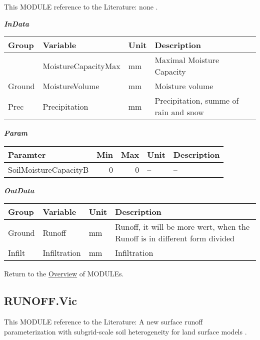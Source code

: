 \documentclass[
]{book}
\begin{document}
This MODULE reference to the Literature: none \citep{none}.

\textbf{\emph{InData}}

\begin{table}[!h]
\centering
\begin{tabular}{l|l|l|l}
\hline
Group & Variable & Unit & Description\\
\hline
 & MoistureCapacityMax & mm & Maximal Moisture Capacity\\
\cline{2-4}
\multirow{-2}{*}{\raggedright\arraybackslash Ground} & MoistureVolume & mm & Moisture volume\\
\cline{1-4}
Prec & Precipitation & mm & Precipitation, summe of rain and snow\\
\hline
\end{tabular}
\end{table}

\textbf{\emph{Param}}

\begin{table}[!h]
\centering
\begin{tabular}{l|r|r|l|l}
\hline
Paramter & Min & Max & Unit & Description\\
\hline
SoilMoistureCapacityB & 0 & 0 & -- & --\\
\hline
\end{tabular}
\end{table}

\textbf{\emph{OutData}}

\begin{table}[!h]
\centering
\begin{tabular}{l|l|l|l}
\hline
Group & Variable & Unit & Description\\
\hline
Ground & Runoff & mm & Runoff, it will be more wert, when the Runoff is in different form divided\\
\cline{1-4}
Infilt & Infiltration & mm & Infiltration\\
\hline
\end{tabular}
\end{table}

Return to the \protect\hyperlink{module}{Overview} of MODULEs.

\hypertarget{RUNOFF.Vic}{%
\subsection{RUNOFF.Vic}\label{RUNOFF.Vic}}

This MODULE reference to the Literature: A new surface runoff parameterization with subgrid-scale soil heterogeneity for land surface models \citep{Liang.2001}.
\end{document}
